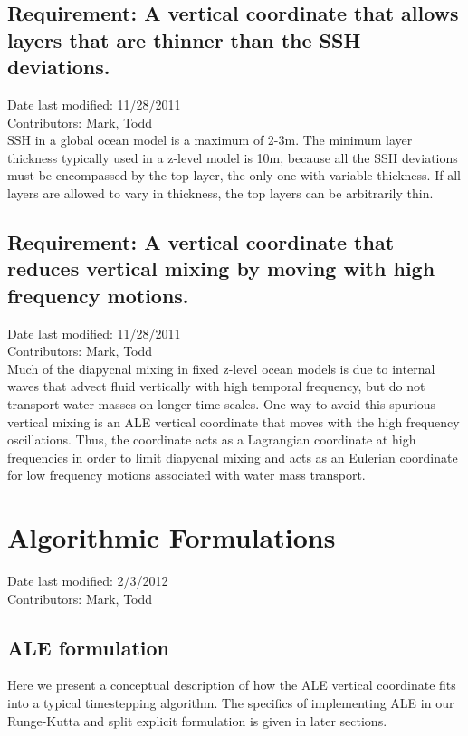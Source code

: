 \documentclass[11pt]{report}
\begin{document}
\section{Requirement: A vertical coordinate that allows layers that are thinner than the SSH deviations.}
Date last modified: 11/28/2011 \\
Contributors: Mark, Todd \\

SSH in a global ocean model is a maximum of 2-3m.  The minimum layer thickness typically used in a z-level model is 10m, because all the SSH deviations must be encompassed by the top layer, the only one with variable thickness.  If all layers are allowed to vary in thickness, the top layers can be arbitrarily thin.

\section{Requirement: A vertical coordinate that reduces vertical mixing by moving with high frequency motions.}
Date last modified: 11/28/2011 \\
Contributors: Mark, Todd \\

Much of the diapycnal mixing in fixed z-level ocean models is due to internal waves that advect fluid vertically with high temporal frequency, but do not transport water masses on longer time scales.  One way to avoid this spurious vertical mixing is an ALE vertical coordinate that moves with the high frequency oscillations. Thus, the coordinate acts as a Lagrangian coordinate at high frequencies in order to limit diapycnal mixing and acts as an Eulerian coordinate for low frequency motions associated with water mass transport.




\chapter{Algorithmic Formulations}
Date last modified: 2/3/2012 \\
Contributors: Mark, Todd \\

\section{ALE formulation}

Here we present a conceptual description of how the ALE vertical coordinate fits into a typical timestepping algorithm.  The specifics of implementing ALE in our Runge-Kutta and split explicit formulation is given in later sections.  
\end{document}

